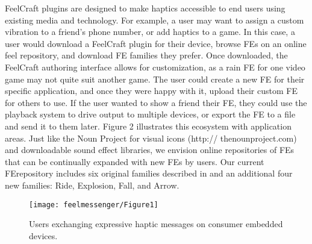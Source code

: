 FeelCraft plugins are designed to make haptics accessible to end users using existing media and technology. For example, a user may want to assign a custom vibration to a friend's phone number, or add haptics to a game. In this case, a user would download a FeelCraft plugin for their device, browse FEs on an online feel repository, and download FE families they prefer. Once downloaded, the FeelCraft authoring interface allows for customization, as a rain FE for one video game may not quite suit another game. The user could create a new FE for their specific application, and once they were happy with it, upload their custom FE for others to use. If the user wanted to show a friend their FE, they could use the playback system to drive output to multiple devices, or export the FE to a file and send it to them later. Figure 2 illustrates this ecosystem with application areas. Just like the Noun Project for visual icons (http:// thenounproject.com) and downloadable sound effect libraries, we envision online repositories of FEs that can be continually expanded with new FEs by users. Our current FErepository includes six original families described in \cite{Israr2014} and an additional four new families: Ride, Explosion, Fall, and Arrow.





\begin{figure}[htbp] %
   \centering
   \texttt{[image: feelmessenger/Figure1]} 
   \caption{Users exchanging expressive haptic messages on consumer embedded devices.}
   \label{fig:feelmessenger:fig1}
\end{figure}



